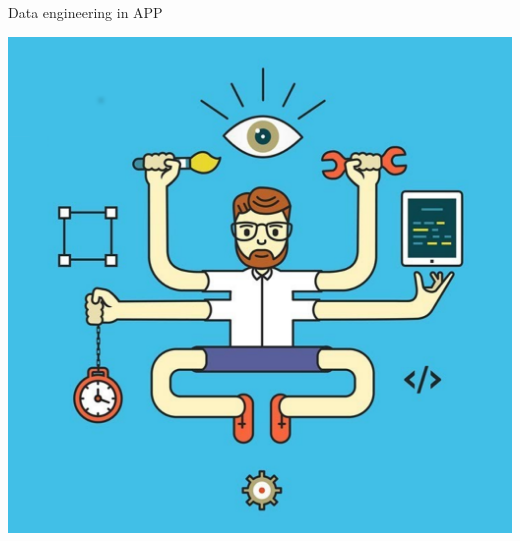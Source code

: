 \begin{frame}{Data engineering in APP}
\begin{minipage}[c]{0.52\textwidth}
\begin{itemize}
  \end{itemize}
\end{minipage}
\hfill
\begin{minipage}[c]{0.47\textwidth}
  \includegraphics[width=1\textwidth]{pics/DE_fun.pdf}
\end{minipage}
\end{frame}


